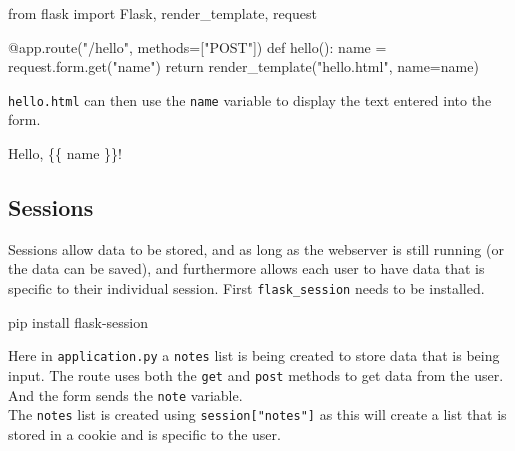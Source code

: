\documentclass[]{book}
\newenvironment{Shaded}{\begin{snugshade}}{\end{snugshade}}
\newcommand{\StringTok}[1]{\textcolor[rgb]{0.31,0.60,0.02}{#1}}
\newcommand{\BuiltInTok}[1]{#1}
\newcommand{\ExtensionTok}[1]{#1}
\newcommand{\NormalTok}[1]{#1}
\begin{document}
\begin{Shaded}
\begin{Highlighting}[]
\ExtensionTok{from}\NormalTok{ flask import Flask, render_template, request}

\ExtensionTok{@app.route}\NormalTok{(}\StringTok{"/hello"}\NormalTok{, methods=[}\StringTok{"POST"}\NormalTok{])             }
\ExtensionTok{def}\NormalTok{ hello()}\BuiltInTok{:}                                       
    \ExtensionTok{name}\NormalTok{ = request.form.get(}\StringTok{"name"}\NormalTok{)                }
    \BuiltInTok{return}\NormalTok{ render_template(}\StringTok{"hello.html"}\NormalTok{, name=name)}
\end{Highlighting}
\end{Shaded}

\texttt{hello.html} can then use the \texttt{name} variable to display
the text entered into the form.

\begin{Shaded}
\begin{Highlighting}[]
\ExtensionTok{Hello}\NormalTok{, \{\{ name \}\}!}
\end{Highlighting}
\end{Shaded}

\subsection{Sessions}\label{sessions}

Sessions allow data to be stored, and as long as the webserver is still
running (or the data can be saved), and furthermore allows each user to
have data that is specific to their individual session. First
\texttt{flask\_session} needs to be installed.

\begin{Shaded}
\begin{Highlighting}[]
\ExtensionTok{pip}\NormalTok{ install flask-session}
\end{Highlighting}
\end{Shaded}

Here in \texttt{application.py} a \texttt{notes} list is being created
to store data that is being input. The route uses both the \texttt{get}
and \texttt{post} methods to get data from the user. And the form sends
the \texttt{note} variable.\\
The \texttt{notes} list is created using \texttt{session{[}"notes"{]}}
as this will create a list that is stored in a cookie and is specific to
the user.
\end{document}
